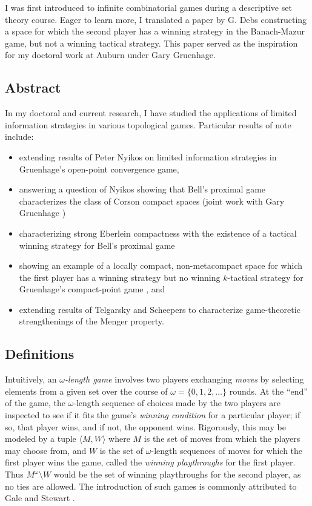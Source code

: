 \documentclass[11pt]{amsart}
\theoremstyle{plain}
\newcommand{\<}{\langle}
\renewcommand{\>}{\rangle}
\newcommand{\term}{\textit}
\begin{document}
I was first introduced to infinite combinatorial games during a descriptive
set theory course. Eager to learn more, I translated a paper by G. Debs
\cite{MR817083} constructing a space for which the second player has a winning
strategy in the Banach-Mazur game, but not a winning tactical
strategy. This paper served as the inspiration for my doctoral work at
Auburn under Gary Gruenhage.

\subsection*{Abstract}

In my doctoral and current research, I have studied the applications of
limited information strategies in various topological games. Particular results
of note include:
  \begin{itemize}
    \item extending results of Peter Nyikos \cite{MR1031771} on limited
          information strategies in Gruenhage's open-point convergence game,
    \item answering a question of Nyikos \cite{nyikosProximalPreprint} showing
          that Bell's proximal game characterizes the class of Corson compact
          spaces (joint work with Gary Gruenhage \cite{MR3227201})
    \item characterizing strong Eberlein compactness with the existence of
          a tactical winning strategy for Bell's proximal game
    \item showing an example of a locally compact, non-metacompact space for
          which the first player has a winning strategy but no winning
          $k$-tactical strategy for Gruenhage's compact-point game
          \cite{MR752278}, and
    \item extending results of Telgarsky \cite{MR753073} and Scheepers
          \cite{MR1273523} to characterize
          game-theoretic strengthenings of the Menger property.
  \end{itemize}

\subsection*{Definitions}

Intuitively, an
\term{$\omega$-length game} involves two players exchanging \term{moves} by
selecting elements from a given set over the course of $\omega=\{0,1,2,\dots\}$
rounds. At the ``end'' of the game, the $\omega$-length sequence of choices
made by the two players
are inspected to see if it fits the game's \term{winning condition} for a
particular player; if so, that player wins, and if not, the opponent wins.
Rigorously, this may be modeled by a tuple $\<M,W\>$ where $M$ is the set of
moves from which the players may choose from, and $W$ is the set of
$\omega$-length sequences of moves
for which the first player wins the game, called the \term{winning playthroughs}
for the first player. Thus $M^\omega\setminus W$ would be the set of winning
playthroughs for the second player, as no ties are allowed.
The introduction of such games is commonly attributed to Gale and Stewart
\cite{MR0054922}.
\end{document}
